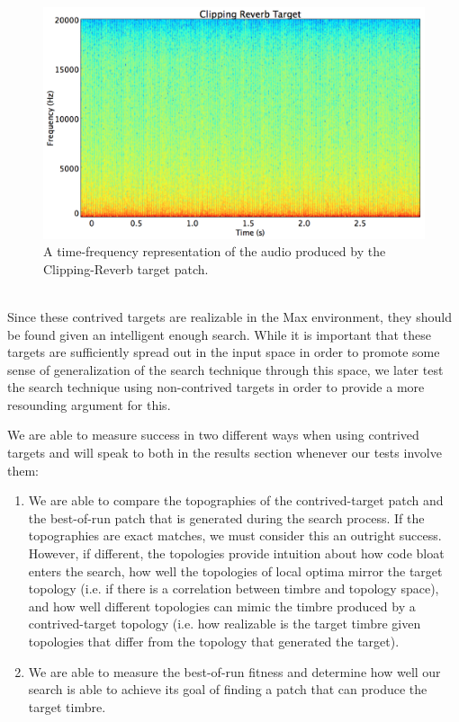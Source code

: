 \documentclass[12pt]{report} 	%
\numberwithin{figure}{chapter}
\numberwithin{table}{chapter}
\numberwithin{equation}{chapter}
\begin{document}
\begin{flushleft}
\begin{figure}[h!]
\begin{center}
\includegraphics[scale=0.35,width=\linewidth]{ClippingReverbTargetSTFT}
\caption[Clipping reverb sawtooth time-frequency representation]{A time-frequency representation of the audio produced by the Clipping-Reverb target patch.}
\end{center}
\end{figure}
\\
Since these contrived targets are realizable in the Max environment, they should be found given an intelligent enough search. While it is important that these targets are sufficiently spread out in the input space in order to promote some sense of generalization of the search technique through this space, we later test the search technique using non-contrived targets in order to provide a more resounding argument for this.

We are able to measure success in two different ways when using contrived targets and will speak to both in the results section whenever our tests involve them:
\begin{enumerate}
\item We are able to compare the topographies of the contrived-target patch and the best-of-run patch that is generated during the search process. If the topographies are exact matches, we must consider this an outright success. However, if different, the topologies provide intuition about how code bloat enters the search, how well the topologies of local optima mirror the target topology (i.e. if there is a correlation between timbre and topology space), and how well different topologies can mimic the timbre produced by a contrived-target topology (i.e. how realizable is the target timbre given topologies that differ from the topology that generated the target).
\item We are able to measure the best-of-run fitness and determine how well our search is able to achieve its goal of finding a patch that can produce the target timbre.
\end{enumerate}


\end{flushleft}
\end{document}
